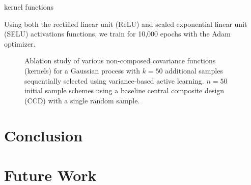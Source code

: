 \documentclass[conference]{IEEEtran}
\begin{document}
	kernel functions
	
	Using both the rectified linear unit (ReLU) and scaled exponential linear unit (SELU) activations functions, we train for 10,000 epochs with the Adam optimizer.
	
	\begin{figure}[h]
		\centering
		
		\caption{Ablation study of various non-composed covariance functions (kernels) for a Gaussian process with $k=50$ additional samples sequentially selected using variance-based active learning. $n=50$ initial sample schemes using a baseline central composite design (CCD) with a single random sample.}
	\end{figure}
	
	\section{Conclusion}
	\label{sec:conclusion}
	
	
	\section{Future Work}
	\label{sec:future-work}
	
	
	
	
	
	
	
\end{document}
